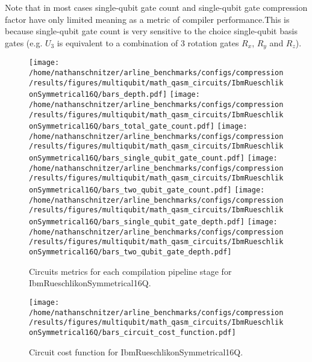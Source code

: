 \documentclass{report}%
\begin{document}
%
Note that in most cases single-qubit gate count and single-qubit gate compression factor
                have only limited meaning as a metric of compiler performance.This is because single-qubit
                gate count is very sensitive to the choice single-qubit basis gates (e.g. $U_3$ is
                equivalent to a combination of 3 rotation gates $R_x$, $R_y$ and $R_z$).%


\begin{figure}[h!]%
\centering%
\texttt{[image: /home/nathanschnitzer/arline\_benchmarks/configs/compression/results/figures/multiqubit/math\_qasm\_circuits/IbmRueschlikonSymmetrical16Q/bars\_depth.pdf]}%
\centering%
\texttt{[image: /home/nathanschnitzer/arline\_benchmarks/configs/compression/results/figures/multiqubit/math\_qasm\_circuits/IbmRueschlikonSymmetrical16Q/bars\_total\_gate\_count.pdf]}%
\linebreak%
\centering%
\texttt{[image: /home/nathanschnitzer/arline\_benchmarks/configs/compression/results/figures/multiqubit/math\_qasm\_circuits/IbmRueschlikonSymmetrical16Q/bars\_single\_qubit\_gate\_count.pdf]}%
\centering%
\texttt{[image: /home/nathanschnitzer/arline\_benchmarks/configs/compression/results/figures/multiqubit/math\_qasm\_circuits/IbmRueschlikonSymmetrical16Q/bars\_two\_qubit\_gate\_count.pdf]}%
\linebreak%
\centering%
\texttt{[image: /home/nathanschnitzer/arline\_benchmarks/configs/compression/results/figures/multiqubit/math\_qasm\_circuits/IbmRueschlikonSymmetrical16Q/bars\_single\_qubit\_gate\_depth.pdf]}%
\centering%
\texttt{[image: /home/nathanschnitzer/arline\_benchmarks/configs/compression/results/figures/multiqubit/math\_qasm\_circuits/IbmRueschlikonSymmetrical16Q/bars\_two\_qubit\_gate\_depth.pdf]}%
\linebreak%
\caption{Circuits metrics for each compilation pipeline stage for IbmRueschlikonSymmetrical16Q.}%
\end{figure}

%


\begin{figure}[h!]%
\centering%
\texttt{[image: /home/nathanschnitzer/arline\_benchmarks/configs/compression/results/figures/multiqubit/math\_qasm\_circuits/IbmRueschlikonSymmetrical16Q/bars\_circuit\_cost\_function.pdf]}%
\caption{Circuit cost function for IbmRueschlikonSymmetrical16Q.}%
\end{figure}
\end{document}
